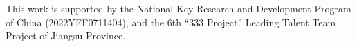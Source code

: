 \documentclass[acmsmall, screen]{acmart}
\begin{document}
	\begin{acks}
		This work is supported by the National Key Research and Development Program of China
		\newline
		(2022YFF0711404), and the 6th “333 Project” Leading Talent Team Project of Jiangsu Province.
	\end{acks}

	
	
\end{document}

